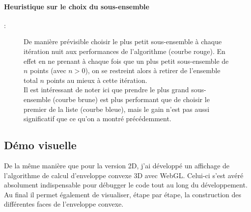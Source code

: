 \documentclass[]{article}
\begin{document}
\paragraph{Heuristique sur le choix du sous-ensemble} :
\begin{figure}[H]
	\begin{center}
	\end{center}
	\caption{
		De manière prévisible choisir le plus petit sous-ensemble à chaque itération nuit aux performances de l'algorithme (courbe rouge). En effet en ne prenant à chaque fois que un plus petit sous-ensemble de $n$ points (avec $n > 0$), on se restreint alors à retirer de l'ensemble total $n$ points au mieux à cette itération.\\
		Il est intéressant de noter ici que prendre le plus grand sous-ensemble (courbe brune) est plus performant que de choisir le premier de la liste (courbe bleue), mais le gain n'est pas aussi significatif que ce qu'on a montré précédemment.
	}
\end{figure}

\subsection{Démo visuelle}
De la même manière que pour la version 2D, j'ai développé un affichage de l'algorithme de calcul d'enveloppe convexe 3D avec WebGL. Celui-ci s'est avéré absolument indispensable pour débugger le code tout au long du développement. Au final il permet également de visualiser, étape par étape, la construction des différentes faces de l'enveloppe convexe.
\end{document}
